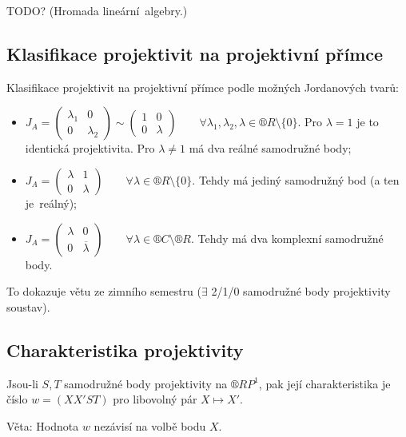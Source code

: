 \documentclass[12pt]{article}					%
\begin{document}
TODO? (Hromada lineární algebry.)

\subsection{Klasifikace projektivit na projektivní přímce}
\begin{poznamka}
	Klasifikace projektivit na projektivní přímce podle možných Jordanových tvarů:
	\begin{itemize}
		\item $J_A = \begin{pmatrix} λ_1 & 0 \\ 0 & λ_2 \end{pmatrix} \sim \begin{pmatrix} 1 & 0 \\ 0 & λ \end{pmatrix} \qquad \forall λ_1, λ_2, λ \in ®R \setminus \{0\}$. Pro $λ = 1$ je to identická projektivita. Pro $λ ≠ 1$ má dva reálné samodružné body;
		\item $J_A = \begin{pmatrix} λ & 1 \\ 0 & λ \end{pmatrix} \qquad \forall λ \in ®R \setminus \{0\}$. Tehdy má jediný samodružný bod (a ten je reálný);
		\item $J_A = \begin{pmatrix} λ & 0 \\ 0 & \overline{λ} \end{pmatrix} \qquad \forall λ \in ®C \setminus ®R$. Tehdy má dva komplexní samodružné body.
	\end{itemize}
\end{poznamka}

\begin{dusledek}
	To dokazuje větu ze zimního semestru ($\exists$ 2/1/0 samodružné body projektivity soustav).
\end{dusledek}

\subsection{Charakteristika projektivity}
\begin{poznamka}
	Jsou-li $S, T$ samodružné body projektivity na $®RP^1$, pak její charakteristika je číslo $w = (XX'ST)$ pro libovolný pár $X \mapsto X'$.

	Věta: Hodnota $w$ nezávisí na volbě bodu $X$.
\end{poznamka}
\end{document}
